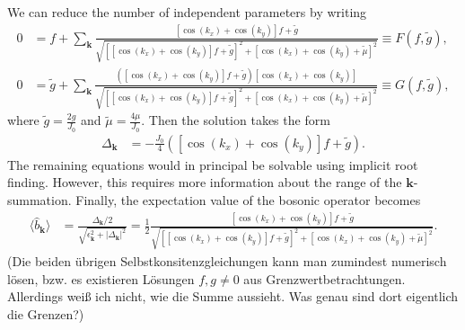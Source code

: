 \documentclass[english, parskip=full]{scrartcl}
\begin{document}
We can reduce the number of independent parameters by writing
\begin{align}
0 &= f + \sum_{\textbf{k}} \frac{[\cos(k_x) + \cos(k_y)] f + \tilde{g}}{\sqrt{\left[ [\cos(k_x) + \cos(k_y)] f + \tilde{g} \right]^2 + \left[ \cos(k_x) + \cos(k_y) + \tilde{\mu} \right]^2}} \equiv F(f,\tilde{g}),\\
0 &= \tilde{g} + \sum_{\textbf{k}} \frac{\left([\cos(k_x) + \cos(k_y)] f + \tilde{g} \right) [\cos(k_x) + \cos(k_y)] }{\sqrt{\left[ [\cos(k_x) + \cos(k_y)] f + \tilde{g} \right]^2 + \left[ \cos(k_x) + \cos(k_y) + \tilde{\mu} \right]^2}} \equiv G(f,\tilde{g}),
\end{align}
where $\tilde{g} = \frac{2g}{J_0}$ and $\tilde{\mu} = \frac{4\mu }{J_0}$.
Then the solution takes the form
\begin{align}
\Delta_{\textbf{k}} &= -\frac{J_0}{4} \left( [\cos(k_x) + \cos(k_y)] f + \tilde{g} \right).
\end{align}
The remaining equations would in principal be solvable using implicit root finding.
However, this requires more information about the range of the $\textbf{k}$-summation.
Finally, the expectation value of the bosonic operator becomes
\begin{align}
\langle \hat{b}_\textbf{k} \rangle &= \frac{\Delta_\textbf{k}/2}{\sqrt{\epsilon_\textbf{k}^2 + |\Delta_\textbf{k}|^2}} = \frac{1}{2} \frac{[\cos(k_x) + \cos(k_y)] f + \tilde{g}}{\sqrt{[ [\cos(k_x) + \cos(k_y)] f + \tilde{g} ]^2 + [ \cos(k_x) + \cos(k_y) + \tilde{\mu} ]^2}}.
\end{align}
(Die beiden übrigen Selbstkonsitenzgleichungen kann man zumindest numerisch lösen, bzw. es existieren Lösungen $f,g\neq 0$ aus Grenzwertbetrachtungen. Allerdings weiß ich nicht, wie die Summe aussieht. Was genau sind dort eigentlich die Grenzen?)




\end{document}
